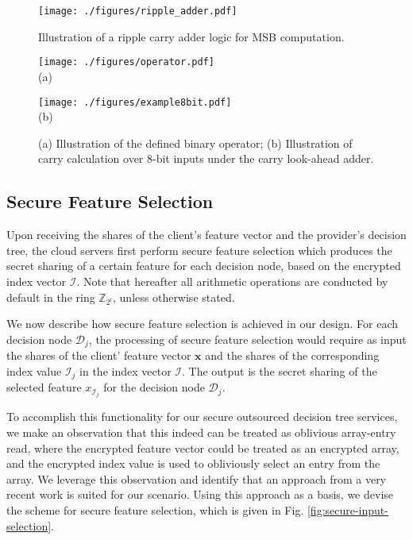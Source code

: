 \documentclass[10pt,journal,compsoc]{IEEEtran}
\begin{document}
\begin{figure*}[t!]
\centerline{\texttt{[image: ./figures/ripple\_adder.pdf]}}
\caption{Illustration of a ripple carry adder logic for MSB computation.}
\label{fig:ripple_carry_adder}
\end{figure*}

\begin{figure*}[!t]
\centering
  \begin{minipage}[t]{0.28\linewidth}
    \centering
    \texttt{[image: ./figures/operator.pdf]}\\\footnotesize{(a)}
  \end{minipage}%
  \begin{minipage}[t]{0.42\linewidth}
    \centering
    \texttt{[image: ./figures/example8bit.pdf]}\\\footnotesize{(b)}
  \end{minipage}
  \caption{(a) Illustration of the defined binary operator; (b) Illustration of carry calculation over $8$-bit inputs under the carry look-ahead adder.}
  \label{fig:carry_look_ahead}
\end{figure*}



\subsection{Secure Feature Selection}


Upon receiving the shares of the client's feature vector and the provider's decision tree, the cloud servers first perform secure feature selection which produces the secret sharing of a certain feature for each decision node, based on the encrypted index vector $\mathcal{I}$.
%
Note that hereafter all arithmetic operations are conducted by default in the ring $\mathbb{Z}_{2^l}$, unless otherwise stated.

We now describe how secure feature selection is achieved in our design.
%
For each decision node $\mathcal{D}_j$, the processing of secure feature selection would require as input the shares of the client' feature vector $\mathbf{x}$ and the shares of the corresponding index value $\mathcal{I}_j$ in the index vector $\mathcal{I}$.
%
The output is the secret sharing of the selected feature $x_{\mathcal{I}_j}$ for the decision node $\mathcal{D}_j$.
%





To accomplish this functionality for our secure outsourced decision tree services, we make an observation that this indeed can be treated as oblivious array-entry read, where the encrypted feature vector could be treated as an encrypted array, and the encrypted index value is used to obliviously select an entry from the array. 
%
We leverage this observation and identify that an approach from a very recent work \cite{CurranLGPD19} is suited for our scenario.
%
Using this approach as a basis, we devise the scheme for secure feature selection, which is given in Fig. \ref{fig:secure-input-selection}.
\end{document}
